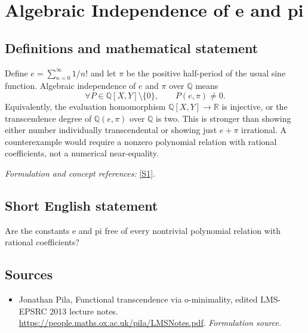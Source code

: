 \documentclass[11pt]{article}
\begin{document}
\section*{\texorpdfstring{Algebraic Independence of e and pi}{Algebraic Independence of e and pi}}\label{168}
\subsection{Definitions and mathematical statement}
Define $e=\sum_{n=0}^{\infty}1/n!$ and let $\pi$ be the positive half-period of the usual sine function. Algebraic independence of $e$ and $\pi$ over ${\mathbb{Q}}$ means
\[
 \forall P\in{\mathbb{Q}}[X,Y]\setminus\{0\},\qquad P(e,\pi)\ne0.
\]
Equivalently, the evaluation homomorphism ${\mathbb{Q}}[X,Y]\to{\mathbb{R}}$ is injective, or the transcendence degree of ${\mathbb{Q}}(e,\pi)$ over ${\mathbb{Q}}$ is two. This is stronger than showing either number individually transcendental or showing just $e+\pi$ irrational. A counterexample would require a nonzero polynomial relation with rational coefficients, not a numerical near-equality.
\par\smallskip\textit{Formulation and concept references:} \href{https://people.maths.ox.ac.uk/pila/LMSNotes.pdf}{[S1]}.

\subsection{Short English statement}
Are the constants e and pi free of every nontrivial polynomial relation with rational coefficients?
\subsection{Sources}
\begin{itemize}
\item[S1]Jonathan Pila, Functional transcendence via o-minimality, edited LMS-EPSRC 2013 lecture notes.
\url{https://people.maths.ox.ac.uk/pila/LMSNotes.pdf}.
\textit{Formulation source.}
\end{itemize}
\end{document}
